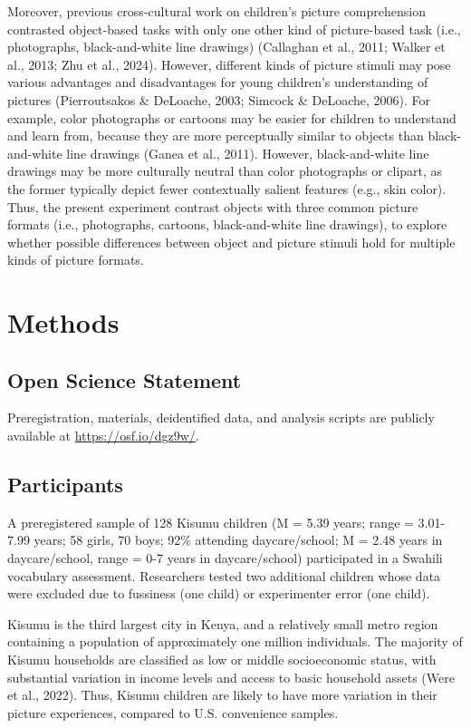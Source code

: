\documentclass[10pt, letterpaper]{article}
\begin{document}
Moreover, previous cross-cultural work on children's picture
comprehension contrasted object-based tasks with only one other kind of
picture-based task (i.e., photographs, black-and-white line drawings)
(Callaghan et al., 2011; Walker et al., 2013; Zhu et al., 2024).
However, different kinds of picture stimuli may pose various advantages
and disadvantages for young children's understanding of pictures
(Pierroutsakos \& DeLoache, 2003; Simcock \& DeLoache, 2006). For
example, color photographs or cartoons may be easier for children to
understand and learn from, because they are more perceptually similar to
objects than black-and-white line drawings (Ganea et al., 2011).
However, black-and-white line drawings may be more culturally neutral
than color photographs or clipart, as the former typically depict fewer
contextually salient features (e.g., skin color). Thus, the present
experiment contrast objects with three common picture formats (i.e.,
photographs, cartoons, black-and-white line drawings), to explore
whether possible differences between object and picture stimuli hold for
multiple kinds of picture formats.

\section{Methods}\label{methods}

\subsection{Open Science Statement}\label{open-science-statement}

Preregistration, materials, deidentified data, and analysis scripts are
publicly available at \url{https://osf.io/dgz9w/}.

\subsection{Participants}\label{participants}

A preregistered sample of 128 Kisumu children (M = 5.39 years; range =
3.01-7.99 years; 58 girls, 70 boys; 92\% attending daycare/school; M =
2.48 years in daycare/school, range = 0-7 years in daycare/school)
participated in a Swahili vocabulary assessment. Researchers tested two
additional children whose data were excluded due to fussiness (one
child) or experimenter error (one child).

Kisumu is the third largest city in Kenya, and a relatively small metro
region containing a population of approximately one million individuals.
The majority of Kisumu households are classified as low or middle
socioeconomic status, with substantial variation in income levels and
access to basic household assets (Were et al., 2022). Thus, Kisumu
children are likely to have more variation in their picture experiences,
compared to U.S. convenience samples.
\end{document}
